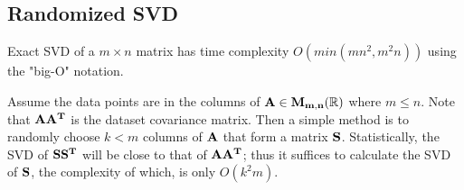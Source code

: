 
\subsection{Randomized SVD}
Exact SVD of a $m \times n$ matrix has time complexity $O(min(mn^2, m^2n))$ using the "big-O" notation.

Assume the data points are in the columns of $\mathbf{A} \in \mathbf{M_{m,n}}(\mathbb{R})$ where $m \leq n$. Note that $\mathbf{AA^T}$ is the dataset covariance matrix. Then a simple method is to randomly choose $k<m$ columns of $\mathbf{A}$ that form a matrix $\mathbf{S}$. Statistically, the SVD of $\mathbf{SS^T}$ will be close to that of $\mathbf{AA^T}$; thus it suffices to calculate the SVD of $\mathbf{S}$, the complexity of which, is only $O(k^2m)$.


